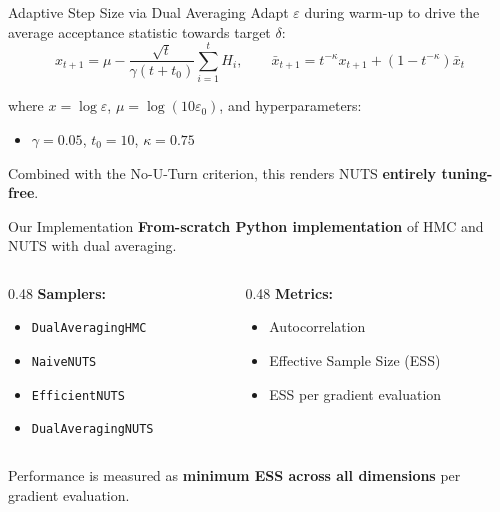 \documentclass{beamer}
\begin{document}
\begin{frame}{Adaptive Step Size via Dual Averaging}
    Adapt $\varepsilon$ during warm-up to drive the average acceptance statistic towards target $\delta$:
    \[
        x_{t+1} = \mu - \frac{\sqrt{t}}{\gamma(t + t_0)} \sum_{i=1}^{t} H_i, \qquad \bar{x}_{t+1} = t^{-\kappa} x_{t+1} + (1 - t^{-\kappa}) \bar{x}_t
    \]

    \vspace{0.2cm}
    where $x = \log\varepsilon$, $\mu = \log(10\varepsilon_0)$, and hyperparameters:
    \begin{itemize}
        \item $\gamma = 0.05$, $t_0 = 10$, $\kappa = 0.75$
    \end{itemize}

    \vspace{0.3cm}
    Combined with the No-U-Turn criterion, this renders NUTS \textbf{entirely tuning-free}.
\end{frame}



\begin{frame}{Our Implementation}
    \textbf{From-scratch Python implementation} of HMC and NUTS with dual averaging.

    \vspace{0.3cm}
    \begin{columns}[T]
        \begin{column}{0.48\textwidth}
            \textbf{Samplers:}
            \begin{itemize}
                \item \texttt{DualAveragingHMC}
                \item \texttt{NaiveNUTS}
                \item \texttt{EfficientNUTS}
                \item \texttt{DualAveragingNUTS}
            \end{itemize}
        \end{column}
        \begin{column}{0.48\textwidth}
            \textbf{Metrics:}
            \begin{itemize}
                \item Autocorrelation
                \item Effective Sample Size (ESS)
                \item ESS per gradient evaluation
            \end{itemize}
        \end{column}
    \end{columns}

    \vspace{0.3cm}
    Performance is measured as \textbf{minimum ESS across all dimensions} per gradient evaluation.
\end{frame}
\end{document}
